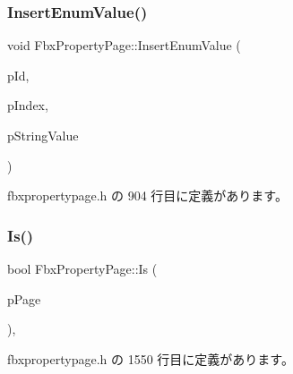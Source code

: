 \mbox{\label{class_fbx_property_page_abe87c30c0b9c9eefdf4cb51a4479cb04}} 
\subsubsection{\texorpdfstring{Insert\+Enum\+Value()}{InsertEnumValue()}}
{\footnotesize\ttfamily void Fbx\+Property\+Page\+::\+Insert\+Enum\+Value (\begin{DoxyParamCaption}\item[{\hyperlink{fbxtypes_8h_a088fa96de3b0b3ea69f0f6afef525dfb}{Fbx\+Int}}]{p\+Id,  }\item[{int}]{p\+Index,  }\item[{const char $\ast$}]{p\+String\+Value }\end{DoxyParamCaption})\hspace{0.3cm}{\ttfamily [inline]}}



 fbxpropertypage.\+h の 904 行目に定義があります。

\mbox{\label{class_fbx_property_page_a8bc4d86023cb4e9d067e2d99c9911e7f}} 
\subsubsection{\texorpdfstring{Is()}{Is()}}
{\footnotesize\ttfamily bool Fbx\+Property\+Page\+::\+Is (\begin{DoxyParamCaption}\item[{\hyperlink{class_fbx_property_page}{Fbx\+Property\+Page} $\ast$}]{p\+Page }\end{DoxyParamCaption})\hspace{0.3cm}{\ttfamily [inline]}, {\ttfamily [protected]}}



 fbxpropertypage.\+h の 1550 行目に定義があります。

\mbox{\label{class_fbx_property_page_af75c2b5ead47c26024b0f0bc6a537a9a}} 
